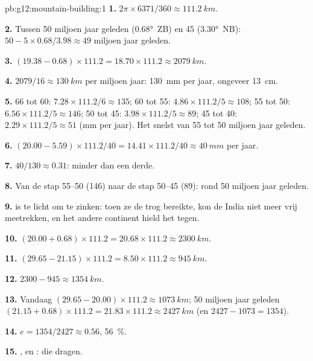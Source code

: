 \begin{solution}{pb:g12:mountain-building:1}
\textbf{1.} $2\pi \times 6371/360 \approx \qty{111.2}{km}$.

\textbf{2.} Tussen 50 miljoen jaar geleden (\ang{0.68}~ZB) en 45 (\ang{3.30}~NB):
$50 - 5 \times 0.68/3.98 \approx 49$ miljoen jaar geleden.

\textbf{3.} $(19.38 - 0.68) \times 111.2 = 18.70 \times 111.2 \approx
\qty{2079}{km}$.

\textbf{4.} $2079/16 \approx \qty{130}{km}$ per miljoen jaar: \qty{130}{mm}
per jaar, ongeveer \qty{13}{cm}.

\textbf{5.} 66 tot 60: $7.28 \times 111.2/6 \approx 135$; 60 tot 55: $4.86
\times 111.2/5 \approx 108$; 55 tot 50: $6.56 \times 111.2/5 \approx 146$; 50
tot 45: $3.98 \times 111.2/5 \approx 89$; 45 tot 40: $2.29 \times 111.2/5
\approx 51$ (\unit{mm} per jaar). Het snelst van 55 tot 50 miljoen jaar geleden.

\textbf{6.} $(20.00 - 5.59) \times 111.2/40 = 14.41 \times 111.2/40 \approx
\qty{40}{mm}$ per jaar.

\textbf{7.} $40/130 \approx 0.31$: minder dan een derde.

\textbf{8.} Van de stap 55--50 (146) naar de stap 50--45 (89): rond 50
miljoen jaar geleden.

\textbf{9.}  is te licht om te zinken: toen ze de
trog bereikte, kon de  India niet meer vrij meetrekken, en het andere
continent hield het tegen.

\textbf{10.} $(20.00 + 0.68) \times 111.2 = 20.68 \times 111.2 \approx
\qty{2300}{km}$.

\textbf{11.} $(29.65 - 21.15) \times 111.2 = 8.50 \times 111.2 \approx
\qty{945}{km}$.

\textbf{12.} $2300 - 945 \approx \qty{1354}{km}$.

\textbf{13.} Vandaag $(29.65 - 20.00) \times 111.2 \approx \qty{1073}{km}$;
50 miljoen jaar geleden $(21.15 + 0.68) \times 111.2 = 21.83 \times 111.2
\approx \qty{2427}{km}$ (en $2427 - 1073 = 1354$).

\textbf{14.} $e = 1354/2427 \approx 0.56$, \qty{56}{\percent}.

\textbf{15.} , en :  die  dragen.


\end{solution}
